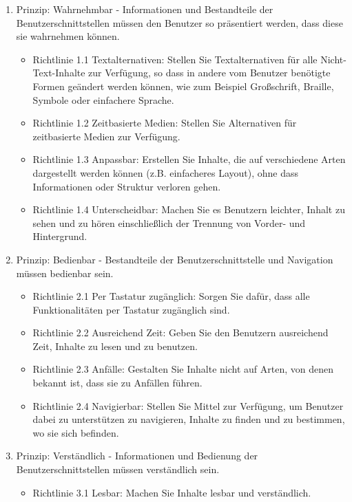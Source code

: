 \begin{enumerate}
  \item Prinzip: Wahrnehmbar - Informationen und Bestandteile der
  Benutzerschnittstellen müssen den Benutzer so präsentiert werden, dass
  diese sie wahrnehmen können.
  \begin{itemize}
    \item Richtlinie 1.1 Textalternativen: Stellen Sie Textalternativen für
    alle Nicht-Text-Inhalte zur Verfügung, so dass in andere vom Benutzer
    benötigte Formen geändert werden können, wie zum Beispiel Großschrift,
    Braille, Symbole oder einfachere Sprache.
    \item Richtlinie 1.2 Zeitbasierte Medien: Stellen Sie Alternativen für
    zeitbasierte Medien zur Verfügung.
    \item Richtlinie 1.3 Anpassbar: Erstellen Sie Inhalte, die auf
    verschiedene Arten dargestellt werden können (z.B. einfacheres Layout),
    ohne dass Informationen oder Struktur verloren gehen.
    \item Richtlinie 1.4 Unterscheidbar: Machen Sie es Benutzern leichter,
    Inhalt zu sehen und zu hören einschließlich der Trennung von Vorder- und
    Hintergrund.
  \end{itemize}
  \item Prinzip: Bedienbar - Bestandteile der Benutzerschnittstelle und
  Navigation müssen bedienbar sein.
  \begin{itemize}
    \item Richtlinie 2.1 Per Tastatur zugänglich: Sorgen Sie dafür, dass alle
    Funktionalitäten per Tastatur zugänglich sind.
    \item Richtlinie 2.2 Ausreichend Zeit: Geben Sie den Benutzern ausreichend
    Zeit, Inhalte zu lesen und zu benutzen.
    \item Richtlinie 2.3 Anfälle: Gestalten Sie Inhalte nicht auf Arten, von
    denen bekannt ist, dass sie zu Anfällen führen.
    \item Richtlinie 2.4 Navigierbar: Stellen Sie Mittel zur Verfügung, um
    Benutzer dabei zu unterstützen zu navigieren, Inhalte zu finden und zu
    bestimmen, wo sie sich befinden.
  \end{itemize}
  \item Prinzip: Verständlich - Informationen und Bedienung der
  Benutzerschnittstellen müssen verständlich sein.
  \begin{itemize}
    \item Richtlinie 3.1 Lesbar: Machen Sie Inhalte lesbar und verständlich.

\end{itemize}
\end{enumerate}
